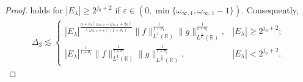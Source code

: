 \documentclass[11pt, twoside, leqno]{article}
\theoremstyle{definition}
\numberwithin{equation}{section}
\begin{document}
\begin{proof}
holds for $|E_\lambda|\geq2^{j_0+2}$ if $\varepsilon\in(0,\min\{\omega_{\infty,1}, \omega_{\infty,1}-1\})$. Consequently,
\begin{align}\label{eq:4.11}
\Delta_{3}\lesssim
\begin{cases}
   |E_\lambda|^{{\frac{\alpha+\theta_1(\omega_{\infty,2}-\omega_{\infty,1}+2\varepsilon)}{(\omega_{\infty,2}+\varepsilon)(1+\theta_{1})}}}
 \|f\|_{L^{1}(\mathbb{R})}^{\frac{1}{1+\theta_{1}}}\|g\|_{L^{\frac{1}{\theta_1}}(\mathbb{R})}^{\frac{1}{1+\theta_{1}}}, & |E_\lambda|\geq2^{j_0+2};\\
  |E_\lambda|^{{\frac{1}{1+\theta_{1}}}}
\|f\|_{L^{1}(\mathbb{R})}^{\frac{1}{1+\theta_{1}}}\|g\|_{L^{\frac{1}{\theta_1}}(\mathbb{R})}^{\frac{1}{1+\theta_{1}}}, &|E_{\lambda}|<2^{j_0+2}.
\end{cases}
\end{align}


\end{proof}
\end{document}
